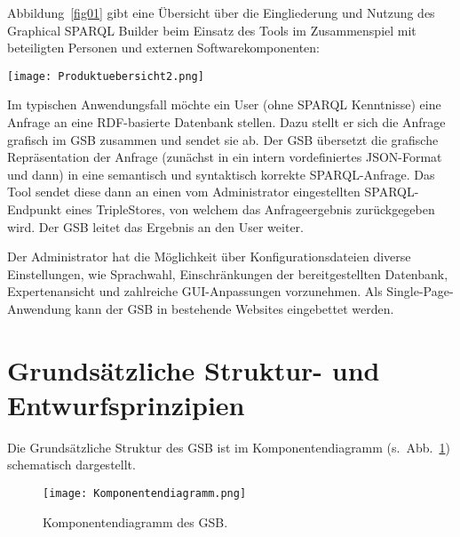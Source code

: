 Abbildung~\ref{fig01} gibt eine Übersicht über die Eingliederung und Nutzung des Graphical SPARQL Builder beim Einsatz des Tools im Zusammenspiel mit beteiligten Personen und externen Softwarekomponenten:

\begin{SCfigure}[20][htbp]%
\texttt{[image: Produktuebersicht2.png]}
\caption{Beziehung des GSB zu Anwender, Datenbank und Administration.}
\label{fig01}
\end{SCfigure}

Im typischen Anwendungsfall möchte ein User (ohne SPARQL Kenntnisse)
eine Anfrage an eine RDF-basierte Datenbank stellen. 
Dazu stellt er sich die Anfrage grafisch im GSB zusammen und sendet
sie ab. Der GSB übersetzt die grafische Repräsentation der Anfrage
(zunächst in ein intern vordefiniertes JSON-Format und dann) in eine
semantisch und syntaktisch korrekte SPARQL-Anfrage. 
Das Tool sendet diese dann an einen vom Administrator eingestellten
SPARQL-Endpunkt eines TripleStores, von welchem das Anfrageergebnis
zurückgegeben wird. Der GSB leitet das Ergebnis an den User weiter.

Der Administrator hat die Möglichkeit über Konfigurationsdateien
diverse Einstellungen, wie Sprachwahl, Einschränkungen der
bereitgestellten Datenbank, Expertenansicht und zahlreiche
GUI-Anpassungen vorzunehmen.
Als Single-Page-Anwendung kann der GSB in bestehende Websites eingebettet werden.


\section{Grundsätzliche Struktur- und Entwurfsprinzipien}

Die Grundsätzliche Struktur des GSB ist im Komponentendiagramm
(s.~Abb.~\ref{fig02}) schematisch dargestellt.

\begin{figure}[tbp]%
\texttt{[image: Komponentendiagramm.png]}
\caption{Komponentendiagramm des GSB.}
\label{fig02}
\end{figure}


